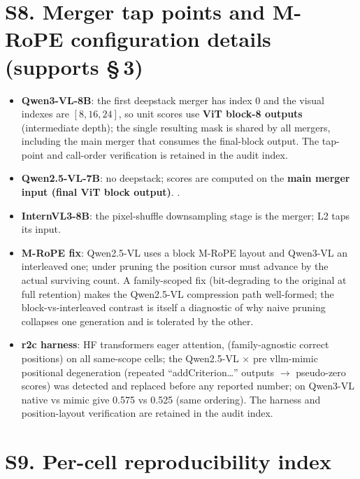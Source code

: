 \section*{S8. Merger tap points and M-RoPE configuration details (supports \S\,3)}

\begin{itemize}
  \item \textbf{Qwen3-VL-8B}: the first deepstack merger has index 0 and the
    visual indexes are $[8,16,24]$, so unit scores use \textbf{ViT block-8 outputs}
    (intermediate depth); the single resulting mask is shared by all mergers,
    including the main merger that consumes the final-block output. The tap-point
    and call-order verification is retained in the audit index.
  \item \textbf{Qwen2.5-VL-7B}: no deepstack; scores are computed on the
    \textbf{main merger input (final ViT block output)}.
    .
  \item \textbf{InternVL3-8B}: the pixel-shuffle downsampling stage is the
    merger; L2 taps its input.
  \item \textbf{M-RoPE fix}: Qwen2.5-VL uses a block M-RoPE layout and Qwen3-VL
    an interleaved one; under pruning the position cursor must advance by the
    actual surviving count. A family-scoped fix (bit-degrading to the original
    at full retention) makes the Qwen2.5-VL compression path well-formed; the
    block-vs-interleaved contrast is itself a diagnostic of why naive pruning
    collapses one generation and is tolerated by the other.
  \item \textbf{r2c harness}: HF transformers eager attention,
     (family-agnostic correct positions) on all same-scope
    cells; the Qwen2.5-VL $\times$ pre vllm-mimic positional degeneration
    (repeated ``addCriterion\ldots'' outputs $\to$ pseudo-zero scores) was
    detected and replaced before any reported number; on Qwen3-VL native vs
    mimic give 0.575 vs 0.525 (same ordering). The harness and position-layout
    verification are retained in the audit index.
\end{itemize}

\section*{S9. Per-cell reproducibility index}


